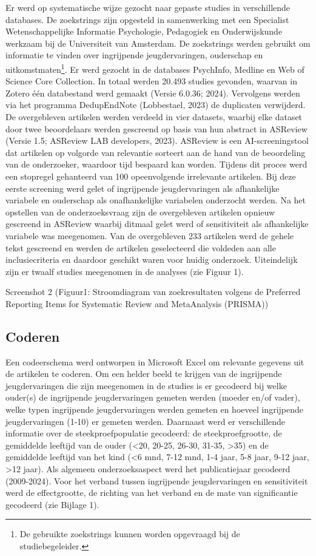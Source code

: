 \documentclass[12pt]{article}
\begin{document}
Er werd op systematische wijze gezocht naar gepaste studies in
verschillende databases. De zoekstrings zijn opgesteld in samenwerking
met een Specialist Wetenschappelijke Informatie Psychologie, Pedagogiek
en Onderwijskunde werkzaam bij de Universiteit van Amsterdam. De
zoekstrings werden gebruikt om informatie te vinden over ingrijpende
jeugdervaringen, ouderschap en uitkomstmaten\footnote{De gebruikte
  zoekstrings kunnen worden opgevraagd bij de studiebegeleider.}. Er
werd gezocht in de databases PsychInfo, Medline en Web of Science Core
Collection. In totaal werden 20.493 studies gevonden, waarvan in Zotero
één databestand werd gemaakt (Versie 6.0.36; 2024). Vervolgens werden
via het programma DedupEndNote (Lobbestael, 2023) de duplicaten
verwijderd. De overgebleven artikelen werden verdeeld in vier datasets,
waarbij elke dataset door twee beoordelaars werden gescreend op basis
van hun abstract in ASReview (Versie 1.5; ASReview LAB developers,
2023). ASReview is een AI-screeningstool dat artikelen op volgorde van
relevantie sorteert aan de hand van de beoordeling van de onderzoeker,
waardoor tijd bespaard kan worden. Tijdens dit proces werd een stopregel
gehanteerd van 100 opeenvolgende irrelevante artikelen. Bij deze eerste
screening werd gelet of ingrijpende jeugdervaringen als afhankelijke
variabele en ouderschap als onafhankelijke variabelen onderzocht werden.
Na het opstellen van de onderzoeksvraag zijn de overgebleven artikelen
opnieuw gescreend in ASReview waarbij ditmaal gelet werd of
sensitiviteit als afhankelijke variabele was meegenomen. Van de
overgebleven 233 artikelen werd de gehele tekst gescreend en werden de
artikelen geselecteerd die voldeden aan alle inclusiecriteria en
daardoor geschikt waren voor huidig onderzoek. Uiteindelijk zijn er
twaalf studies meegenomen in de analyses (zie Figuur 1).

Screenshot 2 (Figuur1: Stroomdiagram van zoekresultaten volgens de
Preferred Reporting Items for Systematic Review and MetaAnalysis
(PRISMA))

\subsection{Coderen}\label{coderen}

Een codeerschema werd ontworpen in Microsoft Excel om relevante gegevens
uit de artikelen te coderen. Om een helder beeld te krijgen van de
ingrijpende jeugdervaringen die zijn meegenomen in de studies is er
gecodeerd bij welke ouder(s) de ingrijpende jeugdervaringen gemeten
werden (moeder en/of vader), welke typen ingrijpende jeugdervaringen
werden gemeten en hoeveel ingrijpende jeugdervaringen (1-10) er gemeten
werden. Daarnaast werd er verschillende informatie over de
steekproefpopulatie gecodeerd: de steekproefgrootte, de gemiddelde
leeftijd van de ouder (\textless20, 20-25, 26-30, 31-35, \textgreater35)
en de gemiddelde leeftijd van het kind (\textless6 mnd, 7-12 mnd, 1-4
jaar, 5-8 jaar, 9-12 jaar, \textgreater12 jaar). Als algemeen
onderzoeksaspect werd het publicatiejaar gecodeerd (2009-2024). Voor het
verband tussen ingrijpende jeugdervaringen en sensitiviteit werd de
effectgrootte, de richting van het verband en de mate van significantie
gecodeerd (zie Bijlage 1).
\end{document}
